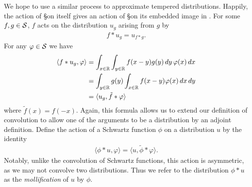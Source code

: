     We hope to use a similar process to approximate tempered distributions.
    Happily, the action of \S on itself gives an action of \S on its embedded image in \SS.
    For some $f,g\in\S$, $f$ acts on the distribution $u_g$ arising from $g$ by
    \begin{align*}
      f*u_g = u_{f*g} \text{.}
    \end{align*}
    For any $\varphi\in\S$ we have
    \begin{align*}
      \langle f*u_g, \varphi\rangle
      &= \int_{x\in\R} \int_{y\in\R} f(x-y)g(y)\,dy\,\varphi(x)\,dx
      \\&= \int_{y\in\R} g(y) \int_{x\in\R} f(x-y)\varphi(x)\,dx\,dy
      \\&= \langle u_g, \tilde f*\varphi\rangle
    \end{align*}
    where $\tilde f(x) = f(-x)$.
    Again, this formula allows us to extend our definition of convolution to allow one of the arguments to be a distribution by an adjoint definition.
    Define the action of a Schwartz function $\phi$ on a distribution $u$ by the identity
    \begin{align*}
      \langle \phi*u, \varphi\rangle
      = \langle u, \tilde\phi*\varphi\rangle \text{.}
    \end{align*}
    Notably, unlike the convolution of Schwartz functions, this action is asymmetric, as we may not convolve two distributions.
    Thus we refer to the distribution $\phi*u$ as the \emph{mollification} of $u$ by $\phi$.


